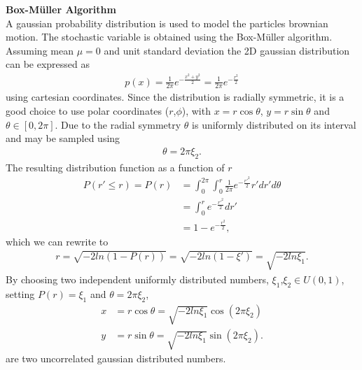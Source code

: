 \documentclass[11pt,a4paper]{article}
\begin{document}
\textbf{Box-Müller Algorithm} \\
A gaussian probability distribution is used to model the particles brownian motion. The stochastic variable
 is obtained using the Box-Müller algorithm. Assuming mean $\mu = 0$ and unit
standard deviation the 2D gaussian distribution can be expressed as
\begin{align*}
   p(x) = \frac{1}{2 \pi }e^{-\frac{x^2 + y^2}{2}} = \frac{1}{2 \pi }e^{-\frac{r^2}{2}}
\end{align*}
using cartesian coordinates. Since the distribution is radially symmetric, it is a good choice
to use polar coordinates ($r$,$\phi$), with $x = r \cos \theta$, $y = r \sin \theta$ 
and $\theta \in [0,2\pi]$. Due to the radial symmetry $\theta$ is uniformly distributed on its interval
and may be sampled using
\begin{align*}
   \theta = 2 \pi \xi_2.
\end{align*}
The resulting distribution function as a function of $r$
\begin{align*}
   P(r' \leq r) = P(r) &= \int_0^{2\pi} \int_0^r \frac{1}{2 \pi }e^{-\frac{r'^2}{2}} r' dr' d\theta \\
                       &= \int_0^r e^{-\frac{r'^2}{2}} dr' \\
                       &= 1-e^{-\frac{r^2}{2}},
\end{align*}
which we can rewrite to 
\begin{align*}
   r = \sqrt{-2ln(1-P(r))} = \sqrt{-2ln(1-\xi')} = \sqrt{-2ln \xi_1}.
\end{align*}
By choosing two independent uniformly distributed numbers, 
$\xi_1$,$\xi_2 \in U(0,1)$, setting $P(r) = \xi_1$ and $\theta = 2 \pi \xi_2 $,
\begin{subequations}
\label{box_muller}
\begin{align}
   x &= r \cos \theta = \sqrt{-2ln \xi_1} \cos (2 \pi \xi_2) \label{box_muller}\\
   y &= r \sin \theta = \sqrt{-2ln \xi_1} \sin (2 \pi \xi_2). \label{box_muller}
   \end{align}
\end{subequations}
are two uncorrelated gaussian distributed numbers.
\end{document}
